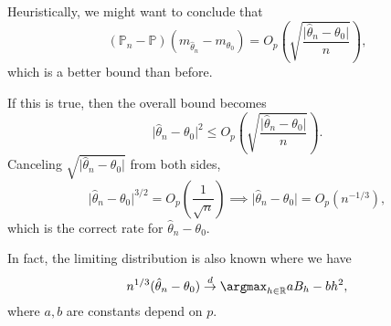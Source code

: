 \begin{intuition}[Heuristic]
	Heuristically, we might want to conclude that
	\[
		(\mathbb{P} _n - \mathbb{P} ) (m_{\hat{\theta } _n } - m_{\theta _0})
		= O_p \left( \sqrt{\frac{\vert \hat{\theta } _n - \theta _0 \vert}{n}} \right),
	\]
	which is a better bound than before.
\end{intuition}

If this is true, then the overall bound becomes
\[
	\vert \hat{\theta } _n - \theta _0 \vert ^2
	\leq O_p \left( \sqrt{\frac{\vert \hat{\theta } _n - \theta _0 \vert}{n}} \right) .
\]
Canceling \(\sqrt{\vert \hat{\theta } _n - \theta _0 \vert} \) from both sides,
\[
	\vert \hat{\theta } _n - \theta _0 \vert^{3 / 2} = O_p \left( \frac{1}{\sqrt{n} } \right)
	\implies \vert \hat{\theta } _n - \theta _0 \vert = O_p(n^{-1 / 3}),
\]
which is the correct rate for \(\hat{\theta } _n - \theta _0\).

\begin{remark}
	In fact, the limiting distribution is also known where we have
	\[
		n^{1 / 3} (\hat{\theta } _n - \theta _0) \overset{d}{\to } \argmax_{h\in \mathbb{R} } aB_h - b h^2,
	\]
	where \(a, b\) are constants depend on \(p\).
\end{remark}
